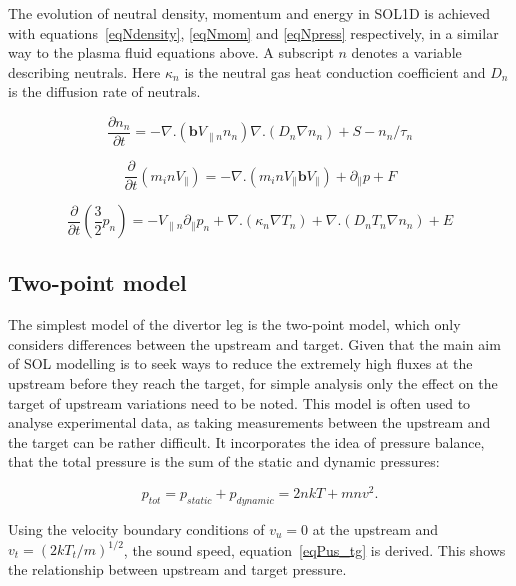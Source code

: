 \documentclass[12pt]{article}  %
\begin{document}
The evolution of neutral density, momentum and energy in SOL1D is achieved with equations~\ref{eqNdensity}, \ref{eqNmom} and \ref{eqNpress} respectively, in a similar way to the plasma fluid equations above. A subscript $n$ denotes a variable describing neutrals. Here $\kappa_n$ is the neutral gas heat conduction coefficient and $D_n$ is the diffusion rate of neutrals.

  \begin{equation}\label{eqNdensity}
  \frac{\partial n_n}{\partial t} = -\nabla.(\textbf{b} V_{\parallel n} n_n) \nabla.(D_n \nabla n_n) + S - n_n/\tau_n
  \end{equation}
  
  \begin{equation}\label{eqNmom}
  \frac{\partial}{\partial t}(m_i n V_{\parallel}) = -\nabla . (m_i n V_{\parallel} \textbf{b} V_{\parallel}) + \partial_{\parallel}p + F
  \end{equation}
  
  \begin{equation}\label{eqNpress}
  \frac{\partial}{\partial t}\left( \frac{3}{2}p_n\right)  = -V_{\parallel n} \partial_{\parallel}p_n + \nabla.(\kappa_n \nabla T_n) + \nabla.(D_n T_n \nabla n_n)+ E
  \end{equation}


\subsection{Two-point model}\label{ssec2PT}
The simplest model of the divertor leg is the two-point model, which only considers differences between the upstream and target. Given that the main aim of SOL modelling is to seek ways to reduce the extremely high fluxes at the upstream before they reach the target, for simple analysis only the effect on the target of upstream variations need to be noted. This model is often used to analyse experimental data, as taking measurements between the upstream and the target can be rather difficult. It incorporates the idea of pressure balance, that the total pressure is the sum of the static and dynamic pressures:

  \begin{equation}\label{eqPbal}
  p_{tot} = p_{static} + p_{dynamic} = 2nkT + mnv^2.
  \end{equation}

Using the velocity boundary conditions of $ v_u=0 $ at the upstream and $ v_t=(2kT_t/m)^{1/2} $, the sound speed, equation~\ref{eqPus_tg} is derived. This shows the relationship between upstream and target pressure.
\end{document}
